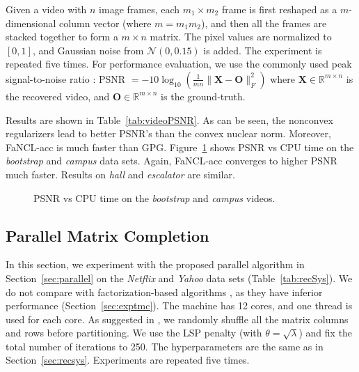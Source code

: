 \documentclass[10pt,journal,compsoc]{IEEEtran}
\def \R{\mathbb R}
\newcommand{\NM}[2]{\| #1 \|_{#2} }
\begin{document}
Given a video with $n$ image frames, each $m_1 \times m_2$ frame is first reshaped as a
$m$-dimensional column vector (where $m = m_1 m_2$), and
then all the frames are stacked together to form a $m \times n$ matrix.
The pixel values are normalized to $[0, 1]$, and
Gaussian noise from $\mathcal{N}(0, 0.15)$ is added.
The experiment is repeated five times.
For performance evaluation, we use the commonly used peak signal-to-noise ratio 
\cite{gu2016weighted}: PSNR $= - 10 \log_{10}(\frac{1}{m n} \NM{\mathbf{X} - \mathbf{O}}{F}^2)$
where 
$\mathbf{X} \in \R^{m \times n}$ is the recovered video,
and $\mathbf{O} \in \R^{m \times n}$ is the ground-truth.



Results are shown in Table~\ref{tab:videoPSNR}.
As can be seen, the nonconvex regularizers lead to 
better  PSNR's than the convex nuclear norm. 
Moreover, 
\textsf{FaNCL-acc} is much faster than \textsf{GPG}.
Figure~\ref{fig:bootstrap} shows PSNR vs CPU time on the {\em bootstrap} and {\em campus} data sets.
Again, \textsf{FaNCL-acc} converges to higher PSNR much faster.
	Results on {\em hall} and {\em escalator} are similar.

\begin{figure}[ht]
	\centering
	
	
	\vspace{-10px}
	\caption{PSNR vs CPU time on the {\em bootstrap} and {\em campus} videos.}
	\label{fig:bootstrap}
\end{figure} 



\subsection{Parallel Matrix Completion}
\label{sec:expparallel}

In this section, we experiment with the proposed parallel algorithm in Section~\ref{sec:parallel}
on the \textit{Netflix} and \textit{Yahoo} data sets (Table~\ref{tab:recSys}).
We do not compare with factorization-based algorithms
\cite{yu2012scalable,recht2013parallel}, as they have 
inferior performance
(Section~\ref{sec:exptmc}).
The machine has 12 cores, and one thread is used for each core.
As suggested in \cite{yu2012scalable}, we randomly shuffle all the matrix columns and rows
before partitioning.  We use the LSP penalty (with $\theta = \sqrt{\lambda}$) and fix the
total number of iterations to 250.  The 
hyperparameters are the
same 
as in Section~\ref{sec:recsys}.
Experiments are repeated five times.
\end{document}
